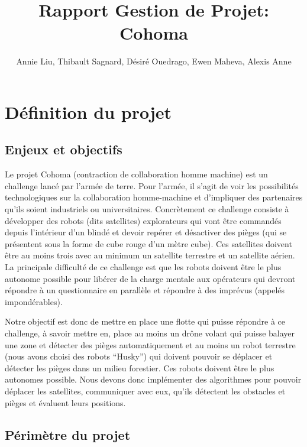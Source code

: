 \documentclass[11pt]{article}
\title{Rapport Gestion de Projet: Cohoma}
\author{Annie Liu, Thibault Sagnard, Désiré Ouedrago, Ewen Maheva, Alexis Anne}
\begin{document}
\maketitle

\section{Définition du projet}

\subsection{Enjeux et objectifs}

Le projet Cohoma (contraction de collaboration homme machine) est un challenge lancé par l’armée de terre. Pour l'armée, il s'agit de voir les possibilités technologiques sur la collaboration homme-machine et d’impliquer des partenaires qu’ils soient industriels ou universitaires. 
Concrètement ce challenge consiste à développer des robots (dits satellites) explorateurs qui vont être commandés depuis l’intérieur d’un blindé et devoir repérer et désactiver des pièges (qui se présentent sous la forme de cube rouge d’un mètre cube). Ces satellites doivent être au moins trois avec au minimum un satellite terrestre et un satellite aérien. La principale difficulté de ce challenge est que les robots doivent être le plus autonome possible pour libérer de la charge mentale aux opérateurs qui devront répondre à un questionnaire en parallèle et répondre à des imprévus (appelés impondérables).

Notre objectif est donc de mettre en place une flotte qui puisse répondre à ce challenge, à savoir mettre en, place au moins un drône volant qui puisse balayer une zone et détecter des pièges automatiquement et au moins un robot terrestre (nous avons choisi des robots “Husky”) qui doivent pouvoir se déplacer et détecter les pièges dans un milieu forestier. Ces robots doivent être le plus autonomes possible. Nous devons donc implémenter des algorithmes pour pouvoir déplacer les satellites, communiquer avec eux, qu’ils détectent les obstacles et pièges et évaluent leurs positions.

\subsection{Périmètre du projet}
\end{document}
